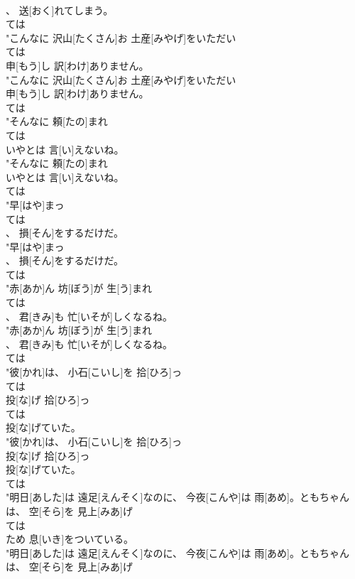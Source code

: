 \documentclass[8pt]{extreport}
\begin{document}
\begin{CJK}{UTF8}{min}
\\	、 送[おく]れてしまう。
\\	ては
\\	"こんなに 沢山[たくさん]お 土産[みやげ]をいただい
\\	ては
\\	申[もう]し 訳[わけ]ありません。
\\	"こんなに 沢山[たくさん]お 土産[みやげ]をいただい
\\	申[もう]し 訳[わけ]ありません。
\\	ては
\\	"そんなに 頼[たの]まれ
\\	ては
\\	いやとは 言[い]えないね。
\\	"そんなに 頼[たの]まれ
\\	いやとは 言[い]えないね。
\\	ては
\\	"早[はや]まっ
\\	ては
\\	、 損[そん]をするだけだ。
\\	"早[はや]まっ
\\	、 損[そん]をするだけだ。
\\	ては
\\	"赤[あか]ん 坊[ぼう]が 生[う]まれ
\\	ては
\\	、 君[きみ]も 忙[いそが]しくなるね。
\\	"赤[あか]ん 坊[ぼう]が 生[う]まれ
\\	、 君[きみ]も 忙[いそが]しくなるね。
\\	ては
\\	"彼[かれ]は、 小石[こいし]を 拾[ひろ]っ
\\	ては
\\	投[な]げ 拾[ひろ]っ
\\	ては
\\	投[な]げていた。
\\	"彼[かれ]は、 小石[こいし]を 拾[ひろ]っ
\\	投[な]げ 拾[ひろ]っ
\\	投[な]げていた。
\\	ては
\\	"明日[あした]は 遠足[えんそく]なのに、 今夜[こんや]は 雨[あめ]。ともちゃんは、 空[そら]を 見上[みあ]げ
\\	ては
\\	ため 息[いき]をついている。
\\	"明日[あした]は 遠足[えんそく]なのに、 今夜[こんや]は 雨[あめ]。ともちゃんは、 空[そら]を 見上[みあ]げ

\end{CJK}
\end{document}
